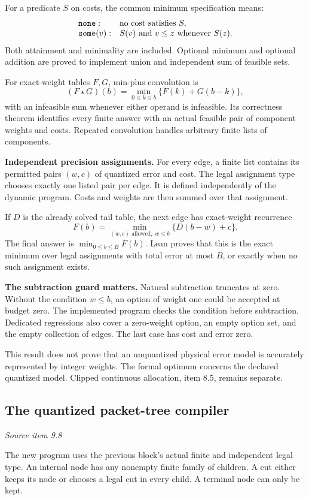For a predicate $S$ on costs, the common minimum specification means:
\[
\begin{array}{ll}
\texttt{none}: & \text{no cost satisfies }S,\\
\texttt{some}(v): & S(v)\text{ and }v\leq z\text{ whenever }S(z).
\end{array}
\]
Both attainment and minimality are included. Optional minimum and optional addition are proved to implement union and independent sum of feasible sets.

For exact-weight tables $F,G$, min-plus convolution is
\[
(F\star G)(b)=\min_{0\leq k\leq b}\{F(k)+G(b-k)\},
\]
with an infeasible sum whenever either operand is infeasible. Its correctness theorem identifies every finite answer with an actual feasible pair of component weights and costs. Repeated convolution handles arbitrary finite lists of components.

\textbf{Independent precision assignments.} For every edge, a finite list contains its permitted pairs $(w,c)$ of quantized error and cost. The legal assignment type chooses exactly one listed pair per edge. It is defined independently of the dynamic program. Costs and weights are then summed over that assignment.

If $D$ is the already solved tail table, the next edge has exact-weight recurrence
\[
F(b)=\min_{(w,c)\text{ allowed},\;w\leq b}\{D(b-w)+c\}.
\]
The final answer is $\min_{0\leq b\leq B}F(b)$. Lean proves that this is the exact minimum over legal assignments with total error at most $B$, or  exactly when no such assignment exists.

\textbf{The subtraction guard matters.} Natural subtraction truncates at zero. Without the condition $w\leq b$, an option of weight one could be accepted at budget zero. The implemented program checks the condition before subtraction. Dedicated regressions also cover a zero-weight option, an empty option set, and the empty collection of edges. The last case has cost and error zero.

This result does not prove that an unquantized physical error model is accurately represented by integer weights. The formal optimum concerns the declared quantized model. Clipped continuous allocation, item 8.5, remains separate.



\subsection{The quantized packet-tree compiler}\label{supp3:subsection:005}\textit{Source item 9.8}\par
The new program uses the previous block's actual finite  and independent legal  type. An internal node has any nonempty finite family of children. A cut either keeps its node or chooses a legal cut in every child. A terminal node can only be kept.

